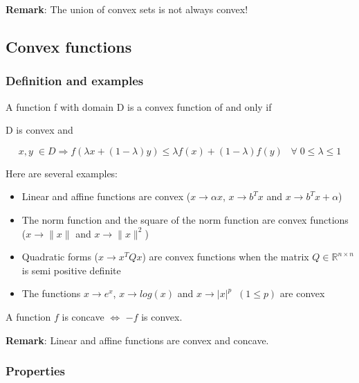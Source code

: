 \textbf{Remark}: The union of convex sets is not always convex!

\subsection{Convex functions}
\subsubsection{Definition and examples}
\begin{definition}
A function f with domain D is a convex function of and only if \\
\begin{center}
D is convex and 
\end{center}
$$x,y\; \in D \Rightarrow f(\lambda x+(1-\lambda)y) \le \lambda f(x)+(1-\lambda)f(y) \;\;\; \forall \; 0\le \lambda \le 1$$
\end{definition}
\vspace{0.5cm}
\begin{example}
\begin{leftbar}
Here are several examples:
\begin{itemize}
\item Linear and affine functions are convex ($x \rightarrow \alpha x$,  $x\rightarrow b^Tx$  and  $x \rightarrow b^Tx+\alpha$)
\item The norm function and the square of the norm function are convex functions ($x \rightarrow \|x\|$ and $x \rightarrow \|x\|^2$)
\item Quadratic forms ($x \rightarrow x^TQx$) are convex functions when the matrix $Q \in \mathbb{R}^{n\times n}$ is semi positive definite
\item The functions $x \rightarrow e^x$,  $x\rightarrow log(x)$ and $x \rightarrow |x|^p \;\;(1 \le p)$ are convex
\end{itemize}
\end{leftbar}
\end{example}
\vspace{0.5cm}
\begin{definition}
A function $f$ is concave $\Leftrightarrow$ $-f$ is convex.
\end{definition}

\textbf{Remark}: Linear and affine functions are convex and concave.

\subsubsection{Properties}

